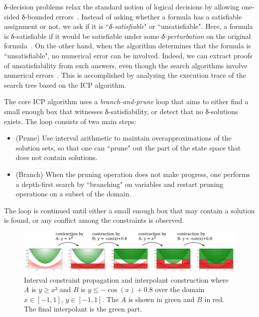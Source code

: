 δ-decision problems relax the standard notion of logical decisions by allowing one-sided δ-bounded errors~\cite{DBLP:conf/lics/GaoAC12,DBLP:conf/cade/GaoAC12}. Instead of asking whether a formula has a satisfiable assignment or not, we ask if it is ``{\em δ-satisfiable}" or ``unsatisfiable". Here, a formula is δ-satisfiable if it would be satisfiable under some {\em δ-perturbation} on the original formula~\cite{DBLP:conf/cade/GaoAC12}. On the other hand, when the algorithm determines that the formula is ``unsatisfiable", no numerical error can be involved. Indeed, we can extract proofs of unsatisfiability from such answers, even though the search algorithms involve numerical errors~\cite{DBLP:conf/synasc/GaoKC14}. This is accomplished by analyzing the execution trace of the search tree based on the ICP algorithm. 


The core ICP algorithm uses a {\em branch-and-prune} loop that aims to either find a small enough box that witnesses δ-satisfiability, or detect that no δ-solutions exists. The loop consists of two main steps:
\begin{itemize}
\item (Prune) Use interval arithmetic to maintain overapproximations of the solution sets, so that one can ``prune" out the part of the state space that does not contain solutions.
\item (Branch) When the pruning operation does not make progress, one performs a depth-first search by ``branching" on variables and restart pruning operations on a subset of the domain. 
\end{itemize}
The loop is continued until either a small enough box that may contain a solution is found, or any conflict among the constraints is observed.

\begin{figure}
\centering
\includegraphics[scale=0.04]{img/example.pdf}
\caption{
    Interval constraint propagation and interpolant construction where $A$ is $y≥x²$ and $B$ is $y ≤ -\cos(x) + 0.8$ over the domain $x∈[-1,1]$, $y∈[-1,1]$.
    The $A$ is shown in green and $B$ in red.
    The final interpolant is the green part.
}
\label{fig:example}
\end{figure}


